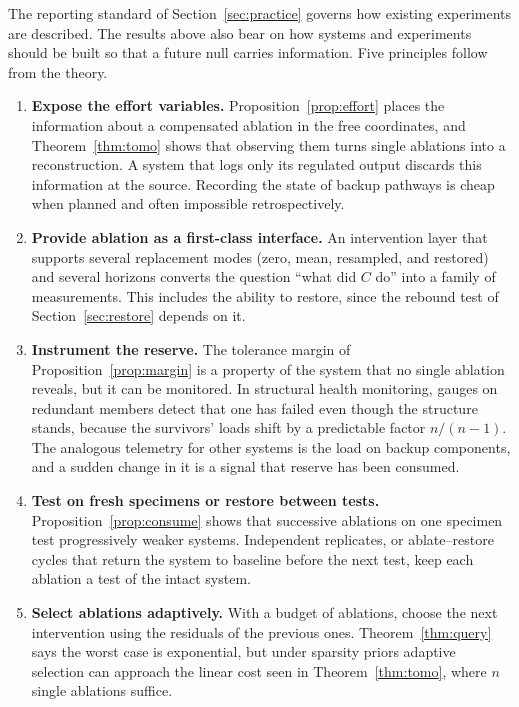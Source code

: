 \documentclass[11pt]{article}
\theoremstyle{definition}
\theoremstyle{remark}
\begin{document}
The reporting standard of Section~\ref{sec:practice} governs how existing experiments are described. The results above also bear on how systems and experiments should be built so that a future null carries information. Five principles follow from the theory.

\begin{enumerate}[label=\textbf{D\arabic*.}]
\item \textbf{Expose the effort variables.} Proposition~\ref{prop:effort} places the information about a compensated ablation in the free coordinates, and Theorem~\ref{thm:tomo} shows that observing them turns single ablations into a reconstruction. A system that logs only its regulated output discards this information at the source. Recording the state of backup pathways is cheap when planned and often impossible retrospectively.
\item \textbf{Provide ablation as a first-class interface.} An intervention layer that supports several replacement modes (zero, mean, resampled, and restored) and several horizons converts the question ``what did $C$ do'' into a family of measurements. This includes the ability to restore, since the rebound test of Section~\ref{sec:restore} depends on it.
\item \textbf{Instrument the reserve.} The tolerance margin of Proposition~\ref{prop:margin} is a property of the system that no single ablation reveals, but it can be monitored. In structural health monitoring, gauges on redundant members detect that one has failed even though the structure stands, because the survivors' loads shift by a predictable factor $n/(n-1)$. The analogous telemetry for other systems is the load on backup components, and a sudden change in it is a signal that reserve has been consumed.
\item \textbf{Test on fresh specimens or restore between tests.} Proposition~\ref{prop:consume} shows that successive ablations on one specimen test progressively weaker systems. Independent replicates, or ablate--restore cycles that return the system to baseline before the next test, keep each ablation a test of the intact system.
\item \textbf{Select ablations adaptively.} With a budget of ablations, choose the next intervention using the residuals of the previous ones. Theorem~\ref{thm:query} says the worst case is exponential, but under sparsity priors adaptive selection can approach the linear cost seen in Theorem~\ref{thm:tomo}, where $n$ single ablations suffice.
\end{enumerate}
\end{document}
